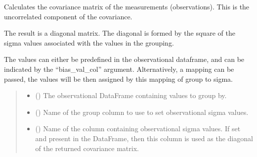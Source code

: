 \documentclass[letterpaper,10pt,english]{sphinxmanual}
\begin{document}

\begin{fulllineitems}
\label{\detokenize{error_covariance:glomar_gridding.error_covariance.uncorrelated_components}}
\pysigstartsignatures
\pysiglinewithargsret
{}
{\sphinxparamcomma {}\sphinxparamcomma {}\sphinxparamcomma {}}
{}
\pysigstopsignatures
\sphinxAtStartPar
Calculates the covariance matrix of the measurements (observations). This
is the uncorrelated component of the covariance.

\sphinxAtStartPar
The result is a diagonal matrix. The diagonal is formed by the square of the
sigma values associated with the values in the grouping.

\sphinxAtStartPar
The values can either be pre\sphinxhyphen{}defined in the observational dataframe, and
can be indicated by the “bias\_val\_col” argument. Alternatively, a mapping
can be passed, the values will be then assigned by this mapping of group to
sigma.
\begin{quote}\begin{description}
\begin{itemize}
\item {}
\sphinxAtStartPar
{} () \textendash{} The observational DataFrame containing values to group by.

\item {}
\sphinxAtStartPar
{} () \textendash{} Name of the group column to use to set observational sigma values.

\item {}
\sphinxAtStartPar
{} () \textendash{} Name of the column containing observational sigma values. If set and
present in the DataFrame, then this column is used as the diagonal of
the returned covariance matrix.


\end{itemize}
\end{description}
\end{quote}
\end{fulllineitems}
\end{document}
